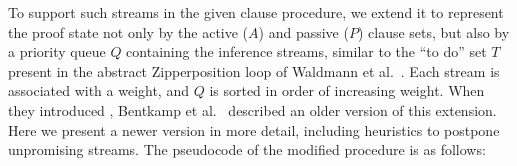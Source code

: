 \documentclass[smallcondensed,draft]{svjour3}     %
\begin{document}
To support such streams in the given clause procedure, we extend it to
represent the proof state not only by the active ($A$) and passive ($P$) clause
sets, but also by a priority queue $Q$ containing the inference streams,
similar to the ``to do'' set $T$ present in the abstract Zipperposition loop of 
Waldmann et al.\  \cite[Sect.~4]{wtrb-20-sat-framework}.
Each stream is associated with a weight, and $Q$ is sorted in order of
increasing weight.
When they introduced \lsup, Bentkamp et al.\
\cite{bentkamp-et-al-2021-lamsup-journal} described an older version of this extension. Here
we present a newer version in more detail, including heuristics to postpone
unpromising streams. The pseudocode of the modified procedure is as follows:
\vspace{2.5\jot}
%
\newcommand\ParamMode{\ensuremath{K_{\mathrm{fair}}}}
\newcommand\ParamMaxStreams{\ensuremath{K_{\mathrm{best}}}}
\newcommand\ParamRetry{\ensuremath{K_{\mathrm{retry}}}}
\newcommand{\assign}[2]{\State \ensuremath{\mathit{#1} \gets #2}}
\newcommand{\assignSameLine}[2]{\ensuremath{\mathit{#1} \gets #2}}
\algrenewcommand\algorithmicindent{1em}
\end{document}
